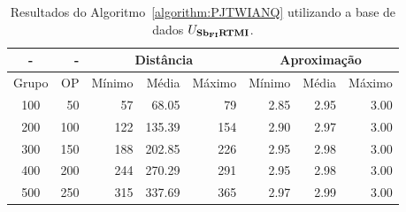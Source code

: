 \begin{table}[!htb]
  \caption{Resultados do Algoritmo~\ref{algorithm:PJTWIANQ} utilizando a base de dados $U_{\textbf{Sb\textsubscript{FI}RTMI}}{}$.}
  \label{table:SKOTKEOE}
  \centering
  \begin{tabular}{|c|r|r|r|r|r|r|r|}
    \hline
      -      &  -   & \multicolumn{3}{c|}{Distância}             & \multicolumn{3}{c|}{Aproximação}           \\ \hline
    Grupo    & OP   & Mínimo       & Média        & Máximo       & Mínimo       & Média        & Máximo       \\ \hline  
    100      & 50   & 57           &  68.05       &  79          & 2.85         & 2.95         & 3.00         \\ \hline
    200      & 100  & 122          & 135.39       & 154          & 2.90         & 2.97         & 3.00         \\ \hline
    300      & 150  & 188          & 202.85       & 226          & 2.95         & 2.98         & 3.00         \\ \hline
    400      & 200  & 244          & 270.29       & 291          & 2.95         & 2.98         & 3.00         \\ \hline
    500      & 250  & 315          & 337.69       & 365          & 2.97         & 2.99         & 3.00         \\ \hline    
  \end{tabular}
\end{table}